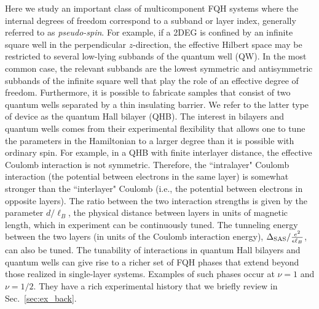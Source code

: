 Here we study an important class of multicomponent FQH systems where the internal degrees of freedom correspond to a subband or layer index, generally referred to as \emph{pseudo-spin}. 
For example, if a 2DEG is confined by an infinite square well in the perpendicular $z$-direction, the effective Hilbert space may be restricted to several low-lying subbands of the quantum well (QW). 
In the most common case, the relevant subbands are the lowest symmetric and antisymmetric subbands of the infinite square well that play the role of an effective  degree of freedom. 
Furthermore, it is possible to fabricate samples that consist of two quantum wells separated by a thin insulating barrier. We refer to the latter type of device as the quantum Hall bilayer (QHB). 
The interest in bilayers and quantum wells comes from their experimental flexibility that allows one to tune the parameters in the Hamiltonian to a larger degree than it is possible with ordinary spin. For example, in a QHB with finite interlayer distance, the effective Coulomb interaction is not  symmetric. Therefore, the ``intralayer" Coulomb interaction (the potential between electrons in the same layer) is somewhat stronger than the ``interlayer" Coulomb (i.e., the potential between electrons in opposite layers).
The ratio between the two interaction strengths is given by the parameter $d/\ell_B$, the physical distance between layers in units of magnetic length, which in experiment can be continuously tuned.
The tunneling energy between the two layers (in units of the Coulomb interaction energy), $\Delta_\textrm{SAS}/\frac{e^2}{\epsilon\ell_B}$, can also be tuned.
The tunability of interactions in quantum Hall bilayers and quantum wells can give rise to a richer set of FQH phases that extend beyond those realized in single-layer systems.
Examples of such phases occur at $\nu=1$ and $\nu=1/2$.
They have a rich experimental history that we briefly review in Sec.~\ref{sec:ex_back}. 

